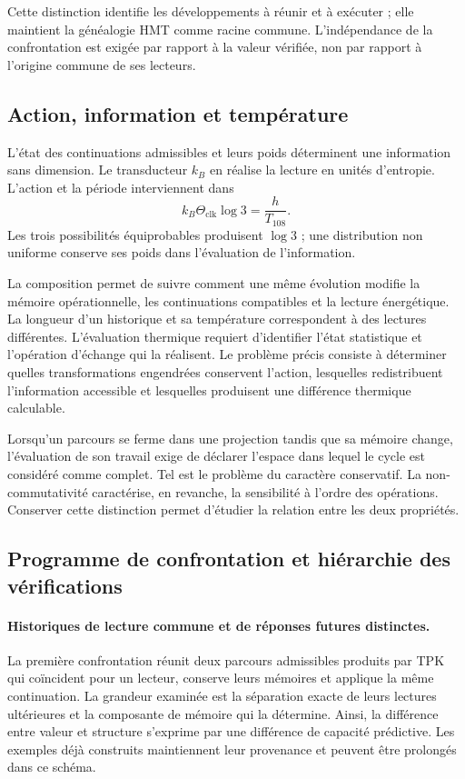 Cette distinction identifie les développements à réunir et à exécuter ; elle maintient la généalogie HMT comme racine commune. L'indépendance de la confrontation est exigée par rapport à la valeur vérifiée, non par rapport à l'origine commune de ses lecteurs.

\subsection{Action, information et température}
\label{md:lectin:termica}

L'état des continuations admissibles et leurs poids déterminent une information sans dimension. Le transducteur $k_B$ en réalise la lecture en unités d'entropie. L'action et la période interviennent dans
\begin{equation}
 k_B\Theta_{\mathrm{clk}}\log3=\frac{h}{T_{108}}.
 \label{md:lectin:accion-informacion}
\end{equation}
Les trois possibilités équiprobables produisent $\log3$ ; une distribution non uniforme conserve ses poids dans l'évaluation de l'information.

La composition permet de suivre comment une même évolution modifie la mémoire opérationnelle, les continuations compatibles et la lecture énergétique. La longueur d'un historique et sa température correspondent à des lectures différentes. L'évaluation thermique requiert d'identifier l'état statistique et l'opération d'échange qui la réalisent. Le problème précis consiste à déterminer quelles transformations engendrées conservent l'action, lesquelles redistribuent l'information accessible et lesquelles produisent une différence thermique calculable.

Lorsqu'un parcours se ferme dans une projection tandis que sa mémoire change, l'évaluation de son travail exige de déclarer l'espace dans lequel le cycle est considéré comme complet. Tel est le problème du caractère conservatif. La non-commutativité caractérise, en revanche, la sensibilité à l'ordre des opérations. Conserver cette distinction permet d'étudier la relation entre les deux propriétés.

\subsection{Programme de confrontation et hiérarchie des vérifications}
\label{md:lectin:contrastes}

\paragraph{Historiques de lecture commune et de réponses futures distinctes.}
La première confrontation réunit deux parcours admissibles produits par TPK qui coïncident pour un lecteur, conserve leurs mémoires et applique la même continuation. La grandeur examinée est la séparation exacte de leurs lectures ultérieures et la composante de mémoire qui la détermine. Ainsi, la différence entre valeur et structure s'exprime par une différence de capacité prédictive. Les exemples déjà construits maintiennent leur provenance et peuvent être prolongés dans ce schéma.

